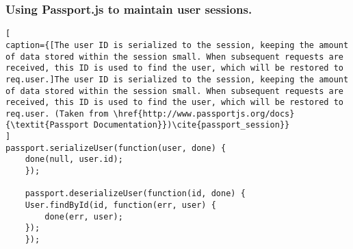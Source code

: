 \subsubsection{Using Passport.js to maintain user sessions.}
\label{sec:passport_session}
\begin{lstlisting}[
caption={[The user ID is serialized to the session, keeping the amount of data stored within the session small. When subsequent requests are received, this ID is used to find the user, which will be restored to req.user.]The user ID is serialized to the session, keeping the amount of data stored within the session small. When subsequent requests are received, this ID is used to find the user, which will be restored to req.user. (Taken from \href{http://www.passportjs.org/docs}{\textit{Passport Documentation}})\cite{passport_session}}
]
passport.serializeUser(function(user, done) {
    done(null, user.id);
    });
    
    passport.deserializeUser(function(id, done) {
    User.findById(id, function(err, user) {
        done(err, user);
    });
    });
\end{lstlisting}

